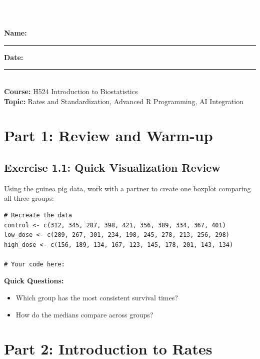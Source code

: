 \documentclass[11pt]{article}
\title{}
\author{}
\date{}
\begin{document}
\begin{tcolorbox}[colback=osaorange,colframe=black,boxrule=2pt,arc=0pt,left=6pt,right=6pt,top=10pt,bottom=10pt]
\centering
\textcolor{white}{\textbf{\Large In-Class Worksheet}}\\
\textcolor{white}{\textbf{\large Rates, Standardization, and Advanced R Programming}}
\end{tcolorbox}

\vspace{8pt}

\noindent\textbf{Name:} \rule{8cm}{0.4pt} \hfill \textbf{Date:} \rule{4cm}{0.4pt}\\[0.5ex]
\textbf{Course:} H524 Introduction to Biostatistics\\
\textbf{Topic:} Rates and Standardization, Advanced R Programming, AI Integration

\vspace{8pt}

\section{Part 1: Review and Warm-up}

\subsection{Exercise 1.1: Quick Visualization Review}
Using the guinea pig data, work with a partner to create one boxplot comparing all three groups:

\begin{lstlisting}
# Recreate the data
control <- c(312, 345, 287, 398, 421, 356, 389, 334, 367, 401)
low_dose <- c(289, 267, 301, 234, 198, 245, 278, 213, 256, 298)
high_dose <- c(156, 189, 134, 167, 123, 145, 178, 201, 143, 134)

# Your code here:

\end{lstlisting}

\textbf{Quick Questions:}
\begin{itemize}
\item Which group has the most consistent survival times?
\item How do the medians compare across groups?
\end{itemize}

\section{Part 2: Introduction to Rates}
\end{document}

